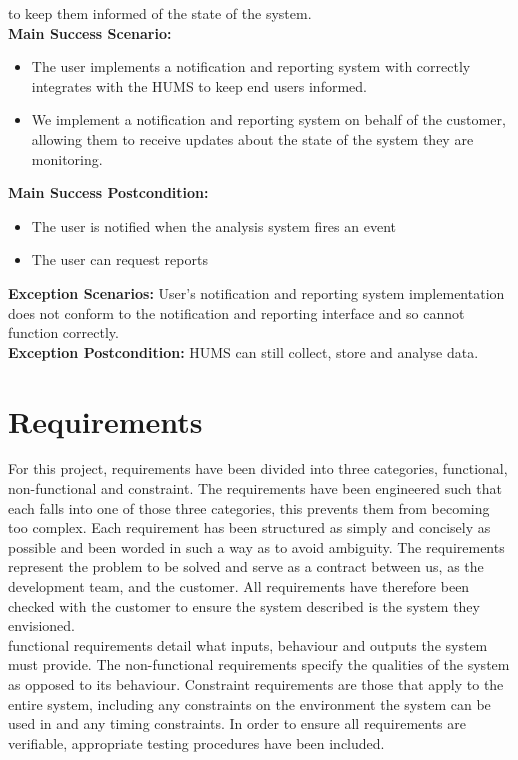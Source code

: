 \documentclass[10pt,a4paper]{article}
\begin{document}
to keep them informed of the state of the system.\\
\textbf{Main Success Scenario:}
\begin{itemize}
\item The user implements a notification and reporting system with correctly
integrates with the HUMS to keep end users informed.
\item We implement a notification and reporting system on behalf of the
customer, allowing them to receive updates about the state of the system they
are monitoring.
\end{itemize}
\textbf{Main Success Postcondition:}
\begin{itemize}
\item The user is notified when the analysis system fires an event
\item The user can request reports
\end{itemize}
\textbf{Exception Scenarios:} User's notification and reporting system
implementation does not conform to the notification and reporting interface and
so cannot function correctly.\\
\textbf{Exception Postcondition:} HUMS can still collect, store and analyse
data.

\section{Requirements}
For this project, requirements have been divided into three categories,
functional, non-functional and constraint. The requirements have been
engineered such that each falls into one of those three categories, this
prevents them from becoming too complex. Each requirement has been
structured as simply and concisely as possible and been worded in such a way
as to avoid ambiguity. The requirements represent the problem to be solved
and serve as a contract between us, as the development team, and the
customer. All requirements have therefore been checked with the customer to
ensure the system described is the system they envisioned.\\
functional requirements detail what inputs, behaviour and outputs the system
must provide. The non-functional requirements specify the qualities of the
system as opposed to its behaviour. Constraint requirements are those that apply
to the entire system, including any constraints on the environment the system
can be used in and any timing constraints. In order to ensure all requirements
are verifiable, appropriate testing procedures have been included.
\end{document}
